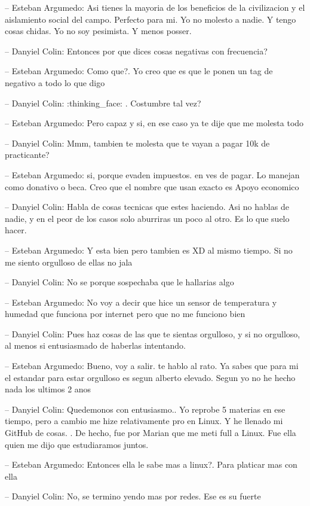 -- Esteban Argumedo: Asi tienes la mayoria de los beneficios de la
civilizacion y el aislamiento social del campo. Perfecto para mi. Yo no
molesto a nadie. Y tengo cosas chidas. Yo no soy pesimista. Y menos
posser.

-- Danyiel Colin: Entonces por que dices cosas negativas con frecuencia?

-- Esteban Argumedo: Como que?. Yo creo que es que le ponen un tag de
negativo a todo lo que digo

-- Danyiel Colin: :thinking\_face: . Costumbre tal vez?

-- Esteban Argumedo: Pero capaz y si, en ese caso ya te dije que me
molesta todo

-- Danyiel Colin: Mmm, tambien te molesta que te vayan a pagar 10k de
practicante?

-- Esteban Argumedo: si, porque evaden impuestos. en ves de pagar. Lo
manejan como donativo o beca. Creo que el nombre que usan exacto es
Apoyo economico

-- Danyiel Colin: Habla de cosas tecnicas que estes haciendo. Asi no
hablas de nadie, y en el peor de los casos solo aburriras un poco al
otro. Es lo que suelo hacer.

-- Esteban Argumedo: Y esta bien pero tambien es XD al mismo tiempo. Si
no me siento orgulloso de ellas no jala

-- Danyiel Colin: No se porque sospechaba que le hallarias algo

-- Esteban Argumedo: No voy a decir que hice un sensor de temperatura y
humedad que funciona por internet pero que no me funciono bien

-- Danyiel Colin: Pues haz cosas de las que te sientas orgulloso, y si
no orgulloso, al menos si entusiasmado de haberlas intentando.

-- Esteban Argumedo: Bueno, voy a salir. te hablo al rato. Ya sabes que
para mi el estandar para estar orgulloso es segun alberto elevado. Segun
yo no he hecho nada los ultimos 2 anos

-- Danyiel Colin: Quedemonos con entusiasmo.. Yo reprobe 5 materias en
ese tiempo, pero a cambio me hize relativamente pro en Linux. Y he
llenado mi GitHub de cosas. . De hecho, fue por Marian que me meti full
a Linux. Fue ella quien me dijo que estudiaramos juntos.

-- Esteban Argumedo: Entonces ella le sabe mas a linux?. Para platicar
mas con ella

-- Danyiel Colin: No, se termino yendo mas por redes. Ese es su fuerte

